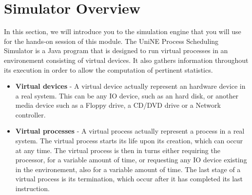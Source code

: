 \documentclass[11pt,a4paper]{scrreprt}
\begin{document}
\section{Simulator Overview}
In this section, we will introduce you to the simulation engine that you will use for the hands-on session of this module. The UniNE Process Scheduling Simulator is a Java program that is designed to run virtual processes in an environement consisting of virtual devices. It also gathers information throughout its execution in order to allow the computation of pertinent statistics.
\begin{itemize}
\item \textbf{Virtual devices} - A virtual device actually represent an hardware device in a real system. This can be any IO device, such as an hard disk, or another media device such as a Floppy drive, a CD/DVD drive or a Network controller.
\item \textbf{Virtual processes} - A virtual process actually represent a process in a real system. The virtual process starts its life upon its creation, which can occur at any time. The virtual process is then in turns either requiring the processor, for a variable amount of time, or requesting any IO device existing in the environement, also for a variable amount of time. The last stage of a virtual process is its termination, which occur after it has completed its last instruction.
\end{itemize}
\end{document}
